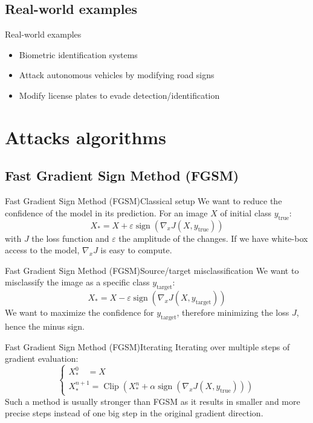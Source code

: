 \documentclass[aspectratio=169]{beamer}
\theoremstyle{definition}
\renewcommand{\epsilon}{\varepsilon}
\DeclareMathOperator*{\sign}{sign}
\DeclareMathOperator*{\Clip}{Clip}
\begin{document}
\subsection{Real-world examples}
\begin{frame}{Real-world examples}
  \begin{itemize}
    \item Biometric identification systems
    \item Attack autonomous vehicles by modifying road signs
    \item Modify license plates to evade detection/identification
  \end{itemize}
\end{frame}

\section{Attacks algorithms}
\subsection{Fast Gradient Sign Method (FGSM)}
\begin{frame}{Fast Gradient Sign Method (FGSM)}{Classical setup}
  We want to reduce the confidence of the model in its prediction. For an image $X$ of initial class $y_{\text{true}}$:
  \begin{equation*}
    X_* = X + \epsilon\sign\left(\nabla_x J(X, y_{\text{true}})\right)
  \end{equation*}
  with $J$ the loss function and $\epsilon$ the amplitude of the changes.
  If we have white-box access to the model, $\nabla_x J$ is easy to compute.
\end{frame}

\begin{frame}{Fast Gradient Sign Method (FGSM)}{Source/target misclassification}
  We want to misclassify the image as a specific class $y_{\text{target}}$:
  \begin{equation*}
    X_* = X - \epsilon\sign\left(\nabla_x J(X, y_{\text{target}})\right)
  \end{equation*}
  We want to maximize the confidence for $y_{\text{target}}$, therefore minimizing the loss $J$, hence the minus sign.
\end{frame}

\begin{frame}{Fast Gradient Sign Method (FGSM)}{Iterating}
  Iterating over multiple steps of gradient evaluation:
  \begin{equation*}
    \begin{cases*}
        X_*^0 \quad= X\\
        X^{n+1}_* = \Clip\left(X^n_*+\alpha\sign\left(\nabla_x J(X, y_{\text{true}})\right)\right)
    \end{cases*}
  \end{equation*}
  Such a method is usually stronger than FGSM as it results in smaller and more precise steps instead of one big step in the original gradient direction.
\end{frame}
\end{document}
